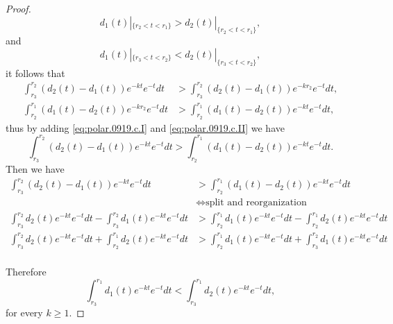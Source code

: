 \begin{proof}
$$d_{1}(t)|_{\{r_{2}<t<r_{1}\}}>d_{2}(t)|_{\{r_{2}<t<r_{1}\}},$$
and
$$d_{1}(t)|_{\{r_{3}<t<r_{2}\}}<d_{2}(t)|_{\{r_{3}<t<r_{2}\}},$$
it follows that
  \begin{align}
  \int_{r_{3}}^{r_{2}}(d_{2}(t)-d_{1}(t))e^{-kt}e^{-t}dt
  &>\int_{r_{3}}^{r_{2}}(d_{2}(t)-d_{1}(t))e^{-kr_{2}}e^{-t}dt,\label{eq:polar.0919.c.I}
  \\
  \int_{r_{2}}^{r_{1}}(d_{1}(t)-d_{2}(t))e^{-kr_{2}}e^{-t}dt
  &>\int_{r_{2}}^{r_{1}}(d_{1}(t)-d_{2}(t))e^{-kt}e^{-t}dt, \label{eq:polar.0919.c.II}
  \end{align}
  thus by adding \eqref{eq:polar.0919.c.I} and \eqref{eq:polar.0919.c.II}
 we have   
 \[
  \int_{r_{3}}^{r_{2}}(d_{2}(t)-d_{1}(t))e^{-kt}e^{-t}dt>\int_{r_{2}}^{r_{1}}(d_{1}(t)-d_{2}(t))e^{-kt}e^{-t}dt.
 \]
Then we have
\begin{align*}
  \int_{r_{3}}^{r_{2}}(d_{2}(t)-d_{1}(t))e^{-kt}e^{-t}dt&>\int_{r_{2}}^{r_{1}}(d_{1}(t)-d_{2}(t))e^{-kt}e^{-t}dt\\ 
&\iff \text{split and reorganization}\\ 
\int_{r_{3}}^{r_{2}}d_{2}(t)e^{-kt}e^{-t}dt -\int_{r_{3}}^{r_{2}}d_{1}(t)e^{-kt}e^{-t}dt&>\int_{r_{2}}^{r_{1}}d_{1}(t)e^{-kt}e^{-t}dt -\int_{r_{2}}^{r_{1}}d_{2}(t)e^{-kt}e^{-t}dt\\ 
\int_{r_{3}}^{r_{2}}d_{2}(t)e^{-kt}e^{-t}dt +\int_{r_{2}}^{r_{1}}d_{2}(t)e^{-kt}e^{-t}dt&>\int_{r_{2}}^{r_{1}}d_{1}(t)e^{-kt}e^{-t}dt +\int_{r_{3}}^{r_{2}}d_{1}(t)e^{-kt}e^{-t}dt\\ 
\end{align*}

 Therefore 
  $$\int_{r_{3}}^{r_{1}}d_{1}(t)e^{-kt}e^{-t}dt<\int_{r_{3}}^{r_{1}}d_{2}(t)e^{-kt}e^{-t}dt,$$
  for every $k\geq1$.



\end{proof}


